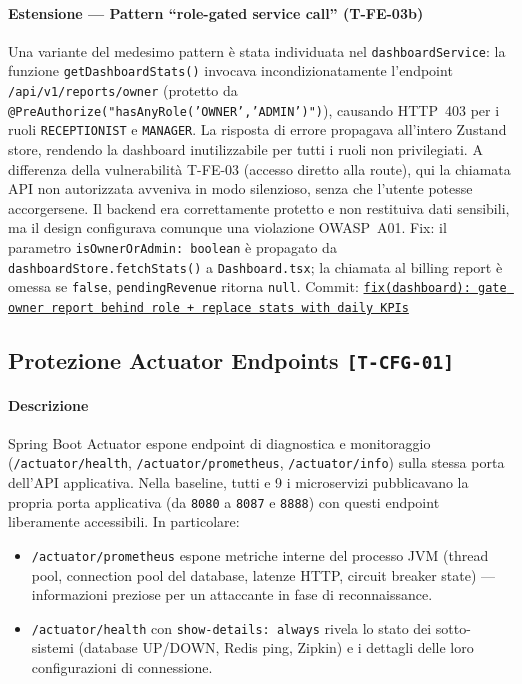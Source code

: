 ﻿\documentclass[a4paper,12pt]{report}
\newcommand{\commitref}[2]{\texttt{\small \href{https://github.com/diegoandruccioli/hotel-pms/commit/#1}{#2}}}
\newcommand{\threat}[1]{\texttt{\small\textcolor{vulnred}{[#1]}}}
\begin{document}
\paragraph{Estensione --- Pattern ``role-gated service call'' (T-FE-03b)}
Una variante del medesimo pattern è stata individuata nel \texttt{dashboardService}:
la funzione \texttt{getDashboardStats()} invocava incondizionatamente l'endpoint
\texttt{/api/v1/reports/owner} (protetto da \texttt{@PreAuthorize("hasAnyRole('OWNER','ADMIN')")}),
causando HTTP~403 per i ruoli \texttt{RECEPTIONIST} e \texttt{MANAGER}.
La risposta di errore propagava all'intero Zustand store, rendendo la dashboard
inutilizzabile per tutti i ruoli non privilegiati.
A differenza della vulnerabilità T-FE-03 (accesso diretto alla route), qui la chiamata
API non autorizzata avveniva in modo silenzioso, senza che l'utente potesse accorgersene.
Il backend era correttamente protetto e non restituiva dati sensibili, ma il design
configurava comunque una violazione OWASP~A01.
Fix: il parametro \texttt{isOwnerOrAdmin: boolean} è propagato da \texttt{dashboardStore.fetchStats()}
a \texttt{Dashboard.tsx}; la chiamata al billing report è omessa se \texttt{false},
\texttt{pendingRevenue} ritorna \texttt{null}.
Commit: \commitref{14a43bb}{fix(dashboard): gate owner report behind role + replace stats with daily KPIs}

\subsection{Protezione Actuator Endpoints \threat{T-CFG-01}}

\paragraph{Descrizione}
Spring Boot Actuator espone endpoint di diagnostica e monitoraggio (\texttt{/actuator/health},
\texttt{/actuator/prometheus}, \texttt{/actuator/info}) sulla stessa porta dell'API applicativa.
Nella baseline, tutti e 9 i microservizi pubblicavano la propria porta applicativa
(da \texttt{8080} a \texttt{8087} e \texttt{8888}) con questi endpoint liberamente accessibili.
In particolare:

\begin{itemize}
  \item \texttt{/actuator/prometheus} espone metriche interne del processo JVM (thread pool,
        connection pool del database, latenze HTTP, circuit breaker state) — informazioni
        preziose per un attaccante in fase di reconnaissance.
  \item \texttt{/actuator/health} con \texttt{show-details: always} rivela lo stato dei
        sotto-sistemi (database UP/DOWN, Redis ping, Zipkin) e i dettagli delle loro
        configurazioni di connessione.
\end{itemize}
\end{document}
